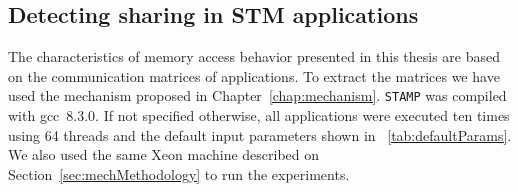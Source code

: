 \subsection{Detecting sharing in STM applications}
The characteristics of memory access behavior presented in this thesis are based on the communication matrices of applications. To extract the matrices we have used the mechanism proposed in Chapter~\ref{chap:mechanism}. %
%
\texttt{STAMP} was compiled with gcc~8.3.0. If not specified otherwise, all applications were executed ten times using 64 threads and the default input parameters shown in \tablename~\ref{tab:defaultParams}. We also used the same Xeon machine described on Section~\ref{sec:mechMethodology} to run the experiments.

